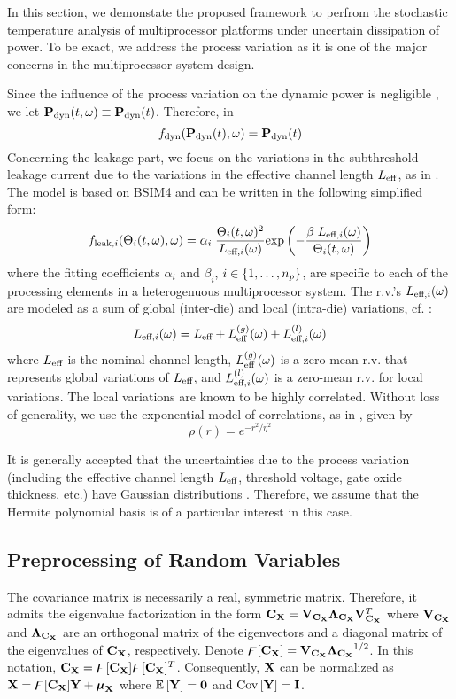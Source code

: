 In this section, we demonstate the proposed framework to perfrom the stochastic temperature analysis of multiprocessor platforms under uncertain dissipation of power. To be exact, we address the process variation as it is one of the major concerns in the multiprocessor system design.

Since the influence of the process variation on the dynamic power is negligible \cite{juan2012, srivastava2010}, we let $\mathbf{P}_{\text{dyn}}(t, \omega) \equiv \mathbf{P}_{\text{dyn}}(t)$. Therefore, in 
\[
  f_{\text{dyn}}(\mathbf{P}_{\text{dyn}}(t), \omega) = \mathbf{P}_{\text{dyn}}(t)
\]
Concerning the leakage part, we focus on the variations in the subthreshold leakage current due to the variations in the effective channel length $L_{\text{eff}}$, as in \cite{juan2012}. The model is based on BSIM4 \cite{bsim4} and can be written in the following simplified form:
\[
f_{\text{leak}, i}(\Theta_i(t, \omega), \omega) = \alpha_i \; \frac{\Theta_i(t, \omega)^2}{L_{\text{eff}, i}(\omega)} \text{exp}\left(-\frac{\beta \; L_{\text{eff}, i}(\omega)}{\Theta_i(t, \omega)}\right)
\]
where the fitting coefficients $\alpha_i$ and $\beta_i$, $i \in \{ 1, \dotsc, {n_p} \}$, are specific to each of the processing elements in a heterogenuous multiprocessor system. The r.v.'s $L_{\text{eff}, i}(\omega)$ are modeled as a sum of global (inter-die) and local (intra-die) variations, cf. \cite{juan2012, srivastava2010, shen2009}:
\[
  L_{\text{eff}, i}(\omega) = L_{\text{eff}} + L_{\text{eff}}^{(g)}(\omega) + L_{\text{eff}, i}^{(l)}(\omega)
\]
where $L_{\text{eff}}$ is the nominal channel length, $L_{\text{eff}}^{(g)}(\omega)$ is a zero-mean r.v. that represents global variations of $L_{\text{eff}}$, and $L_{\text{eff}, i}^{(l)}(\omega)$ is a zero-mean r.v. for local variations. The local variations are known to be highly correlated. Without loss of generality, we use the exponential model of correlations, as in \cite{shen2009}, given by
\[
  \rho(r) = e^{-r^2/\eta^2}
\]

It is generally accepted that the uncertainties due to the process variation (including the effective channel length $L_{\text{eff}}$, threshold voltage, gate oxide thickness, etc.) have Gaussian distributions \cite{srivastava2010, liu2007, juan2012}. Therefore, we assume that the Hermite polynomial basis is of a particular interest in this case.

\subsection{Preprocessing of Random Variables} 
The covariance matrix is necessarily a real, symmetric matrix. Therefore, it admits the eigenvalue factorization \cite{press2007} in the form $\mCov_\mrv{X} = \m{V}_{\mCov_\mrv{X}} \m{\Lambda}_{\mCov_\mrv{X}} \m{V}_{\mCov_\mrv{X}}^T$ where $\m{V}_{\mCov_\mrv{X}}$ and $\m{\Lambda}_{\mCov_\mrv{X}}$ are an orthogonal matrix of the eigenvectors and a diagonal matrix of the eigenvalues of $\mCov_\mrv{X}$, respectively. Denote $\oEigen{\mCov_\mrv{X}} = \m{V}_{\mCov_\mrv{X}} {\m{\Lambda}_{\mCov_\mrv{X}}}^\ifrac{1}{2}$. In this notation, $\mCov_\mrv{X} = \oEigen{\mCov_\mrv{X}} \oEigen{\mCov_\mrv{X}}^T$. Consequently, $\mrv{X}$ can be normalized as $\mrv{X} = \oEigen{\mCov_\mrv{X}} \mrv{y} + \vExp_\mrv{X}$ where $\oExp{\mrv{y}} = \mZero$ and $\oCov{\mrv{y}} = \mI$.

